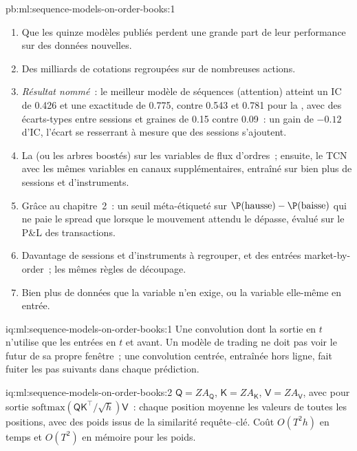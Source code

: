 \begin{solution}{pb:ml:sequence-models-on-order-books:1}
\begin{enumerate}
\item Que les quinze modèles publiés perdent une grande part de leur performance sur des données nouvelles.
\item Des milliards de cotations regroupées sur de nombreuses actions.
\item \emph{Résultat nommé}~: le meilleur modèle de séquences (attention) atteint un IC de 0.426 et une exactitude de 0.775, contre
0.543 et 0.781 pour la , avec des écarts-types entre sessions et graines de 0.15 contre 0.09~: un gain de $-0.12$
d'IC, l'écart se resserrant à mesure que des sessions s'ajoutent.
\item La  (ou les arbres boostés) sur les variables de flux d'ordres~; ensuite, le TCN avec les mêmes variables en canaux
supplémentaires, entraîné sur bien plus de sessions et d'instruments.
\item Grâce au chapitre~2~: un seuil méta-étiqueté sur $\P(\text{hausse}) - \P(\text{baisse})$ qui ne paie le spread que lorsque le
mouvement attendu le dépasse, évalué sur le P\&L des transactions.
\item Davantage de sessions et d'instruments à regrouper, et des entrées market-by-order~; les mêmes règles de découpage.
\item Bien plus de données que la variable n'en exige, ou la variable elle-même en entrée.
\end{enumerate}
\end{solution}

\begin{solution}{iq:ml:sequence-models-on-order-books:1}
Une convolution dont la sortie en $t$ n'utilise que les entrées en $t$ et avant. Un modèle de trading ne doit pas voir le futur de sa propre
fenêtre~; une convolution centrée, entraînée hors ligne, fait fuiter les pas suivants dans chaque prédiction.
\end{solution}

\begin{solution}{iq:ml:sequence-models-on-order-books:2}
$\mathsf Q = ZA_{\mathsf Q}$, $\mathsf K = ZA_{\mathsf K}$, $\mathsf V = ZA_{\mathsf V}$, avec pour sortie $\mathrm{softmax}(\mathsf
Q\mathsf K^\top/\sqrt h)\mathsf V$~: chaque position moyenne les valeurs de toutes les positions, avec des poids issus de la similarité requête--clé.
Coût $O(T^2h)$ en temps et $O(T^2)$ en mémoire pour les poids.
\end{solution}

